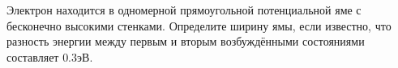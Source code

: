 \documentclass[__main__.tex]{subfiles}
\begin{document}
Электрон находится в одномерной прямоугольной потенциальной яме с бесконечно высокими стенками. Определите ширину ямы, если известно, что разность энергии между первым и вторым возбуждёнными состояниями составляет $0.3\text{эВ}$.\\ 

\end{document}
